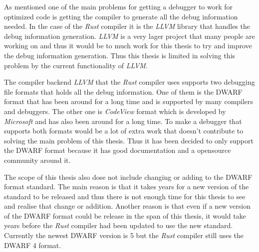 




As mentioned one of the main problems for getting a debugger to work for optimized code is getting the compiler to generate all the debug information needed.
In the case of the \emph{Rust} compiler it is the \emph{LLVM} library that handles the debug information generation.
\emph{LLVM} is a very lager project that many people are working on and thus it would be to much work for this thesis to try and improve the debug information generation.
Thus this thesis is limited in solving this problem by the current functionality of \emph{LLVM}.


The compiler backend \emph{LLVM} that the \emph{Rust} compiler uses supports two debugging file formats that holds all the debug information.
One of them is the \gls{DWARF} format that has been around for a long time and is supported by many compilers and debuggers.
The other one is \emph{CodeView} format which is developed by \emph{Microsoft} and has also been around for a long time.
To make a debugger that supports both formats would be a lot of extra work that doesn't contribute to solving the main problem of this thesis.
Thus it has been decided to only support the \gls{DWARF} format because it has good documentation and a opensource community around it.


The scope of this thesis also dose not include changing or adding to the \gls{DWARF} format standard.
The main reason is that it takes years for a new version of the standard to be released and thus there is not enough time for this thesis to see and realise that change or addition.
Another reason is that even if a new version of the \gls{DWARF} format could be release in the span of this thesis, it would take years before the \emph{Rust} compiler had been updated to use the new standard.
Currently the newest \gls{DWARF} version is 5 but the \emph{Rust} compiler still uses the \gls{DWARF} 4 format.


